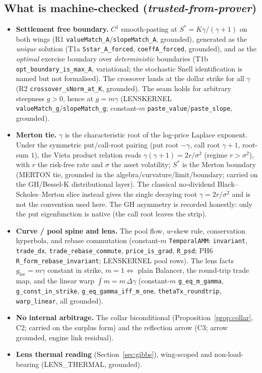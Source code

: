 \documentclass[runningheads]{llncs}
\newcommand{\tfp}{\emph{trusted-from-prover}}
\begin{document}
\subsection{What is machine-checked (\tfp{})}
\begin{itemize}[leftmargin=2em]
  \item \textbf{Settlement free boundary.} $C^{1}$ smooth-pasting at
        $S^{\ast}=K\gamma/(\gamma+1)$ on both wings (R1
        \texttt{valueMatch\_A}/\texttt{slopeMatch\_A}, grounded), generated as the
        \emph{unique} solution (T1a \texttt{Sstar\_A\_forced},
        \texttt{coeffA\_forced}, grounded), and as the \emph{optimal} exercise
        boundary over \emph{deterministic} boundaries (T1b \texttt{opt\_boundary\_is\_max\_A}, variational; the
        stochastic Snell identification is named but not formalised). The crossover lands at the dollar strike for all
        $\gamma$ (R2 \texttt{crossover\_sNorm\_at\_K}, grounded). The seam holds
        for arbitrary steepness $g>0$, hence at $g=m\gamma$ (LENSKERNEL
        \texttt{valueMatch\_g}/\texttt{slopeMatch\_g}; constant-$m$
        \texttt{paste\_value}/\texttt{paste\_slope}, grounded).
  \item \textbf{Merton tie.} $\gamma$ is the characteristic root of the log-price
        Laplace exponent. Under the symmetric put/call-root pairing (put root
        $-\gamma$, call root $\gamma+1$, root-sum $1$), the Vieta product relation
        reads $\gamma(\gamma+1)=2r/\sigma^{2}$ (regime $r>\sigma^{2}$), with $r$
        the risk-free rate and $\sigma$ the asset volatility; $S^{\ast}$ is the
        Merton boundary (MERTON tie, grounded in the
        algebra/curvature/limit/boundary; carried on the GH/Bessel-K
        distributional layer). The classical no-dividend Black--Scholes--Merton
        slice instead gives the single decaying root $\gamma=2r/\sigma^{2}$ and is
        not the convention used here. The GH asymmetry is recorded honestly: only
        the put eigenfunction is native (the call root leaves the strip).
  \item \textbf{Curve / pool spine and lens.} The pool flow, $w$-skew rule,
        conservation hyperbola, and rebase commutation (constant-$m$
        \texttt{TemporalAMM}: \texttt{invariant}, \texttt{trade\_dx},
        \texttt{trade\_rebase\_commute}, \texttt{price\_is\_grad},
        \texttt{R\_psd}; PH6 \texttt{R\_form\_rebase\_invariant}; LENSKERNEL pool
        rows). The lens facts $g_{\mathrm{loc}}=m\gamma$ constant in strike,
        $m=1\Leftrightarrow$ plain Balancer, the round-trip trade map, and the
        linear warp $\int m=m\,\Delta\gamma$ (constant-$m$ \texttt{g\_eq\_m\_gamma},
        \texttt{g\_const\_in\_strike}, \texttt{g\_eq\_gamma\_iff\_m\_one},
        \texttt{thetaTx\_roundtrip}, \texttt{warp\_linear}, all grounded).
  \item \textbf{No internal arbitrage.} The collar biconditional
        (Proposition~\ref{prop:collar}, C2; carried on the surplus form) and the
        reflection arrow (C3; arrow grounded, engine link residual).
  \item \textbf{Lens thermal reading} (Section~\ref{sec:gibbs}), wing-scoped and
        non-load-bearing (LENS\_THERMAL, grounded).
\end{itemize}
\end{document}

